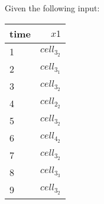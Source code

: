 
Given the following input:
\begin{table}[ht!]
\begin{center}
\begin{tabular}{|l|r|}
\hline
time & $\mathit{x}1$\\
\hline
1 & $\mathit{cell}_3_2$ \\
2 & $\mathit{cell}_3_1$ \\
3 & $\mathit{cell}_3_2$ \\
4 & $\mathit{cell}_2_2$ \\
5 & $\mathit{cell}_3_2$ \\
6 & $\mathit{cell}_4_2$ \\
7 & $\mathit{cell}_3_2$ \\
8 & $\mathit{cell}_3_3$ \\
9 & $\mathit{cell}_3_2$ \\
\hline
\end{tabular}
\end{center}
\end{table}

